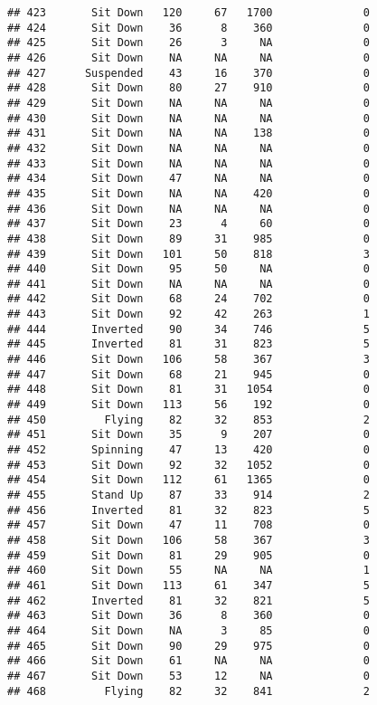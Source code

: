 \documentclass[
]{article}
\begin{document}
\begin{verbatim}
## 423       Sit Down   120     67   1700              0
## 424       Sit Down    36      8    360              0
## 425       Sit Down    26      3     NA              0
## 426       Sit Down    NA     NA     NA              0
## 427      Suspended    43     16    370              0
## 428       Sit Down    80     27    910              0
## 429       Sit Down    NA     NA     NA              0
## 430       Sit Down    NA     NA     NA              0
## 431       Sit Down    NA     NA    138              0
## 432       Sit Down    NA     NA     NA              0
## 433       Sit Down    NA     NA     NA              0
## 434       Sit Down    47     NA     NA              0
## 435       Sit Down    NA     NA    420              0
## 436       Sit Down    NA     NA     NA              0
## 437       Sit Down    23      4     60              0
## 438       Sit Down    89     31    985              0
## 439       Sit Down   101     50    818              3
## 440       Sit Down    95     50     NA              0
## 441       Sit Down    NA     NA     NA              0
## 442       Sit Down    68     24    702              0
## 443       Sit Down    92     42    263              1
## 444       Inverted    90     34    746              5
## 445       Inverted    81     31    823              5
## 446       Sit Down   106     58    367              3
## 447       Sit Down    68     21    945              0
## 448       Sit Down    81     31   1054              0
## 449       Sit Down   113     56    192              0
## 450         Flying    82     32    853              2
## 451       Sit Down    35      9    207              0
## 452       Spinning    47     13    420              0
## 453       Sit Down    92     32   1052              0
## 454       Sit Down   112     61   1365              0
## 455       Stand Up    87     33    914              2
## 456       Inverted    81     32    823              5
## 457       Sit Down    47     11    708              0
## 458       Sit Down   106     58    367              3
## 459       Sit Down    81     29    905              0
## 460       Sit Down    55     NA     NA              1
## 461       Sit Down   113     61    347              5
## 462       Inverted    81     32    821              5
## 463       Sit Down    36      8    360              0
## 464       Sit Down    NA      3     85              0
## 465       Sit Down    90     29    975              0
## 466       Sit Down    61     NA     NA              0
## 467       Sit Down    53     12     NA              0
## 468         Flying    82     32    841              2

\end{verbatim}
\end{document}
